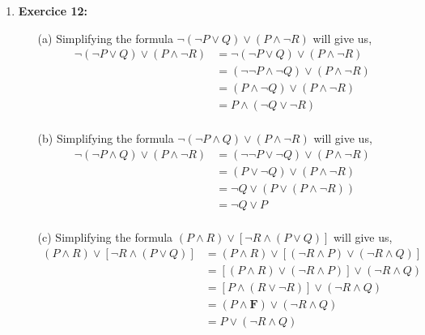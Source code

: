 \documentclass{article} %
\begin{document}
\begin{enumerate}
    \item \textbf{Exercice 12:}
    \begin{itemize}
        \item[(a)] Simplifying the formula $\neg (\neg P \lor Q) \lor (P \land \neg R)$ will give us,
        \begin{equation*}
            \begin{split}
                \neg (\neg P \lor Q) \lor (P \land \neg R) & = \neg (\neg P \lor Q) \lor (P \land \neg R) \\
                & = (\neg \neg P \land \neg Q) \lor (P \land \neg R) \\
                & = (P \land \neg Q) \lor (P \land \neg R) \\
                & = P \land (\neg Q \lor \neg R) \\
            \end{split}
        \end{equation*}
        \item[(b)] Simplifying the formula $\neg (\neg P \land Q) \lor (P \land \neg R)$ will give us,
        \begin{equation*}
            \begin{split}
                \neg (\neg P \land Q) \lor (P \land \neg R) & = (\neg \neg P \lor \neg Q) \lor (P \land \neg R) \\
                & = (P \lor \neg Q) \lor (P \land \neg R) \\
                & = \neg Q \lor (P \lor (P \land \neg R)) \\
                & = \neg Q \lor P \\
            \end{split}
        \end{equation*}
        \item[(c)] Simplifying the formula $(P \land R) \lor [\neg R \land (P \lor Q)]$ will give us,
        \begin{equation*}
            \begin{split}
                (P \land R) \lor [\neg R \land (P \lor Q)] & = (P \land R) \lor [(\neg R \land P) \lor (\neg R \land Q)] \\
                & = [(P \land R) \lor (\neg R \land P)] \lor (\neg R \land Q) \\
                & = [P \land (R \lor \neg R)] \lor (\neg R \land Q) \\
                & = (P \land \textbf{F}) \lor (\neg R \land Q) \\
                & = P \lor (\neg R \land Q) \\
            \end{split}
        \end{equation*}

    \end{itemize}

    \end{enumerate}
\end{document}
